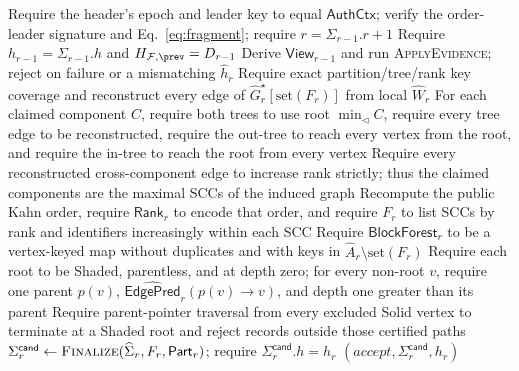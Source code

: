 \begin{algorithm}[h!]
\caption{\textsc{VerifyFragment}: Expanded Verification}
\label{alg:verify-fragment-expanded}
\footnotesize
{}
Require the header's epoch and leader key to equal $\mathsf{AuthCtx}$; verify
the order-leader signature and Eq.~\eqref{eq:fragment}; require
$r=\Sigma_{r-1}.r+1$\;
Require $h_{r-1}=\Sigma_{r-1}.h$ and
$H_{\mathcal F,\prev}=D_{r-1}$\;
Derive $\mathsf{View}_{r-1}$ and run
\textsc{ApplyEvidence}; reject on failure or a mismatching $\widehat h_r$\;
Require exact partition/tree/rank key coverage and reconstruct every edge of $\widehat G_r^\star[\mathrm{set}(F_r)]$ from local $\widehat W_r$\;
For each claimed component $C$, require both trees to use root
$\min_{\triangleleft}C$, require every tree edge to be reconstructed, require
the out-tree to reach every vertex from the root, and require the in-tree to
reach the root from every vertex\;
Require every reconstructed cross-component edge to increase rank strictly; thus the claimed components are the maximal SCCs of the induced graph\;
Recompute the public Kahn order, require $\mathsf{Rank}_r$ to encode that order, and require $F_r$ to list SCCs by rank and identifiers increasingly within each SCC\;
Require $\mathsf{BlockForest}_r$ to be a vertex-keyed map without duplicates and with keys in
$\widehat A_r\setminus\mathrm{set}(F_r)$\;
Require each root to be Shaded, parentless, and at depth zero; for every non-root $v$, require one parent $p(v)$,
$\widehat{\mathsf{EdgePred}}_r(p(v)\to v)$, and depth one greater than its parent\;
Require parent-pointer traversal from every excluded Solid vertex to terminate at a Shaded root and reject records outside those certified paths\;
$\Sigma_r^{\mathsf{cand}}\gets
  \textsc{Finalize}(\widehat\Sigma_r,F_r,\mathsf{Part}_r)$;
require $\Sigma_r^{\mathsf{cand}}.h=h_r$\;
\KwRet $(accept,\Sigma_r^{\mathsf{cand}},h_r)$
\end{algorithm}

